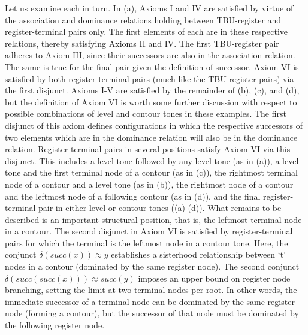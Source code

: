 \documentclass{article}
\newcommand{\ap}{\approx}
\begin{document}
Let us examine each in turn. In (a), Axioms I and IV are satisfied by virtue of the association and dominance relations holding between TBU-register and register-terminal pairs only. The first elements of each are in these respective relations, thereby satisfying Axioms II and IV. The first TBU-register pair adheres to Axiom III, since their successors are also in the association relation. The same is true for the final pair given the definition of successor. Axiom VI is satisfied by both register-terminal pairs (much like the TBU-register pairs) via the first disjunct. Axioms I-V are satisfied by the remainder of (b), (c), and (d), but the definition of Axiom VI is worth some further discussion with respect to possible combinations of level and contour tones in these examples. The first disjunct of this axiom defines configurations in which the respective successors of two elements which are in the dominance relation will also be in the dominance relation. Register-terminal pairs in several positions satisfy Axiom VI via this disjunct. This includes a level tone followed by any level tone (as in (a)), a level tone and the first terminal node of a contour (as in (c)), the rightmost terminal node of a contour and a level tone (as in (b)), the rightmost node of a contour and the leftmost node of a following contour (as in (d)), and the final register-terminal pair in either level or contour tones ((a)-(d)). What remains to be described is an important structural position, that is, the leftmost terminal node in a contour. The second disjunct in Axiom VI is satisfied by register-terminal pairs for which the terminal is the leftmost node in a contour tone. Here, the conjunct $\delta(succ(x)) \ap y$ establishes a sisterhood relationship between `t' nodes in a contour (dominated by the same register node). The second conjunct $\delta(succ(succ(x)))\ap succ(y)$ imposes an upper bound on register node branching, setting the limit at two terminal nodes per root. In other words, the immediate successor of a terminal node can be dominated by the same register node (forming a contour), but the successor of that node must be dominated by the following register node. 
\end{document}
